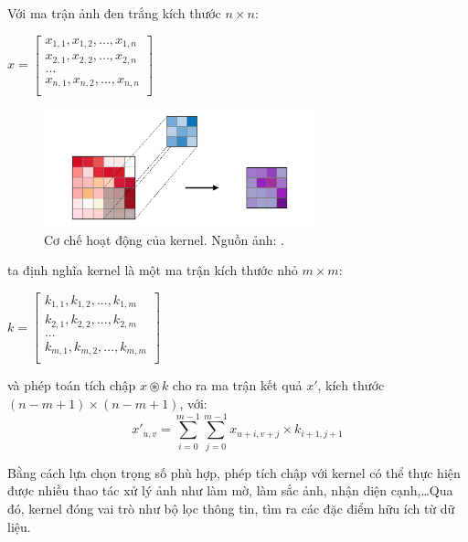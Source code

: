\documentclass[12pt]{extreport}
\begin{document}
Với ma trận ảnh đen trắng kích thước $ n \times n $:
\begin{center}
    \begin{math}
        x = \begin{bmatrix}
            x_{1,1}, x_{1,2},..., x_{1,n} \\
            x_{2,1}, x_{2,2},..., x_{2,n} \\
            ...                           \\
            x_{n,1}, x_{n,2},..., x_{n,n} \\
        \end{bmatrix}
    \end{math}
\end{center}
\begin{figure}[H]
    \centering
    \includegraphics[width=0.7\textwidth]{figure6}
    \caption{Cơ chế hoạt động của kernel. Nguồn ảnh: \cite{CS230}.}
\end{figure}
ta định nghĩa kernel là một ma trận kích thước nhỏ $ m \times m $:
\begin{center}
    \begin{math}
        k = \begin{bmatrix}
            k_{1,1}, k_{1,2},..., k_{1,m} \\
            k_{2,1}, k_{2,2},..., k_{2,m} \\
            ...                           \\
            k_{m,1}, k_{m,2},..., k_{m,m} \\
        \end{bmatrix}
    \end{math}
\end{center}
và phép toán tích chập $ x \circledast k $ cho ra ma trận kết quả $ x' $, kích thước $ (n - m + 1) \times (n - m + 1) $, với:
$$ x'_{u,v} = \sum_{i=0}^{m-1} \sum_{j=0}^{m-1} x_{u+i,v+j} \times k_{i+1,j+1} $$

Bằng cách lựa chọn trọng số phù hợp, phép tích chập với kernel có thể thực hiện được nhiều thao tác xử lý ảnh như làm mờ, làm sắc ảnh, nhận diện cạnh,\dots Qua đó, kernel đóng vai trò như bộ lọc thông tin, tìm ra các đặc điểm hữu ích từ dữ liệu.
\end{document}
